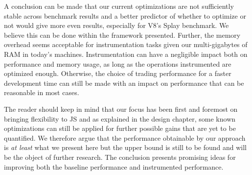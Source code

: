 A conclusion can be made that our current optimizations are not sufficiently
stable across benchmark results and a better predictor of whether to optimize
or not would give more even results, especially for V8's Splay benchmark. We
believe this can be done within the framework presented. Further, the memory
overhead seems acceptable for instrumentation tasks given our multi-gigabytes
of RAM in today's machines. Instrumentation can have a negligible impact both
on performance and memory usage, as long as the operations instrumented are
optimized enough. Otherwise, the choice of trading performance for a faster
development time can still be made with an impact on performance that can be
reasonable in most cases.

The reader should keep in mind that our focus has been first and foremost on
bringing flexibility to JS and as explained in the design chapter, some known
optimizations can still be applied for further possible gains that are yet to
be quantified. We therefore argue that the performance obtainable by our
approach is \textit{at least} what we present here but the upper bound is still
to be found and will be the object of further research. The conclusion presents
promising ideas for improving both the baseline performance and instrumented
performance.

